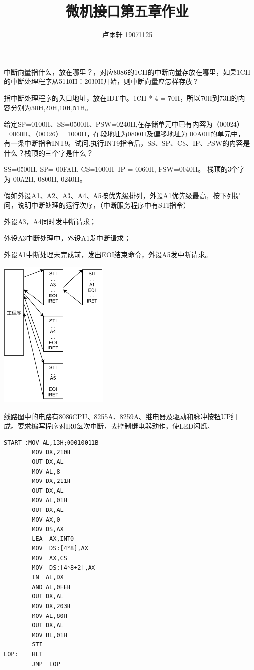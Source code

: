 \documentclass{ctexart}
\title{微机接口第五章作业}
\author{卢雨轩 19071125}
\begin{document}
\maketitle

\begin{outline}[enumerate]
    \1 中断向量指什么，放在哪里？，对应8086的1CH的中断向量存放在哪里，如果1CH的中断处理程序从5110H：2030H开始，则中断向量应怎样存放？
    

    指中断处理程序的入口地址，放在IDT中。1CH * 4 = 70H，所以70H到73H的内容分别为30H,20H,10H,51H。

    \1 给定SP=0100H、SS=0500H、PSW=0240H,在存储单元中已有内容为（00024）=0060H、（00026）=1000H，在段地址为0800H及偏移地址为
    00A0H的单元中，有一条中断指令INT9。试问,执行INT9指令后，SS、SP、CS、IP、PSW的内容是什么？栈顶的三个字是什么？

    SS=0500H, SP= 00FAH, CS=1000H, IP = 0060H, PSW=0040H。
    栈顶的3个字为 00A2H, 0800H, 0240H。

    \1 假如外设A1、A2、A3、A4、A5按优先级排列，外设A1优先级最高，按下列提问，说明中断处理的运行次序，（中断服务程序中有STI指令）

    \2 外设A3，A4同时发中断请求；

    \2 外设A3中断处理中，外设A1发中断请求；

    \2 外设A1中断处理未完成前，发出EOI结束命令，外设A5发中断请求。

    \begin{center}
        \includegraphics[width=0.4\textwidth]{3-image.pdf}
    \end{center}
\1 线路图中的电路有8086CPU、8255A、8259A、继电器及驱动和脉冲按钮UP组成。要求编写程序对IR0每次中断，去控制继电器动作，使LED闪烁。
\begin{verbatim}
START :MOV AL,13H;00010011B
        MOV DX,210H
        OUT DX,AL
        MOV AL,8
        MOV DX,211H
        OUT DX,AL
        MOV AL,01H
        OUT DX,AL
        MOV AX,0
        MOV DS,AX  
        LEA  AX,INT0
        MOV  DS:[4*8],AX
        MOV  AX,CS
        MOV  DS:[4*8+2],AX
        IN  AL,DX
        AND AL,0FEH        
        OUT DX,AL
        MOV DX,203H
        MOV AL,80H
        OUT DX,AL
        MOV BL,01H
        STI
LOP:    HLT 
        JMP  LOP


\end{verbatim}
\end{outline}
\end{document}
